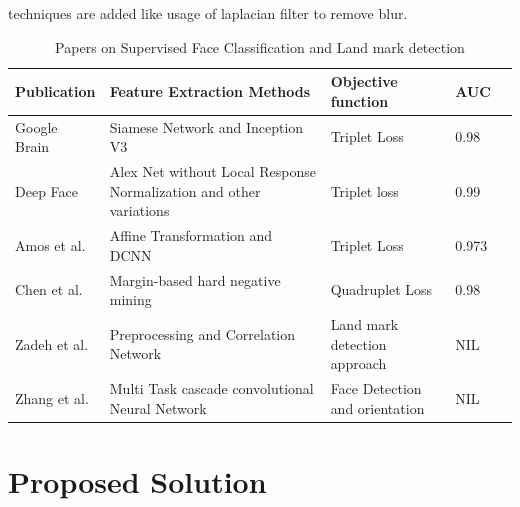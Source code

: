 \documentclass[a4paper,12pt, twoside]{NITKReport}
\begin{document}
techniques are added like usage of laplacian filter to remove blur.  

\begin{table}
  \centering
\begin{tabular}{ |p{3cm}|p{3cm}|p{2.5cm}|p{2cm}|p{2cm}|}
 \hline
 Publication & Feature Extraction Methods & Objective function & AUC\\
 \hline
 Google Brain \cite{schroff2015facenet} & Siamese Network and Inception V3 & Triplet Loss & 0.98\\
 \hline
 Deep Face \cite{parkhi2015deep} & Alex Net without Local Response Normalization and other variations \cite{DBLP:journals/corr/SimonyanZ14a} & Triplet loss & 0.99 \\
\hline
  Amos et al. \cite{amos2016openface} & Affine Transformation and DCNN & Triplet Loss & 0.973\\ 
 \hline
  Chen et al.\cite{chen2017beyond} & Margin-based hard negative mining & Quadruplet Loss & 0.98 \\
 \hline
 Zadeh et al.\cite{zadeh2017convolutional} & Preprocessing and Correlation Network & Land mark detection approach & NIL \\ 
 \hline
Zhang et al. \cite{zhang2016joint} & Multi Task cascade convolutional Neural Network & Face Detection and orientation  & NIL \\
\hline
\end{tabular}
\caption{Papers on Supervised Face Classification and Land mark detection}\label{table:papers1}
\end{table}




\newpage
\chapter{Proposed Solution}
\label{chap3}
\label{solution}
\end{document}
